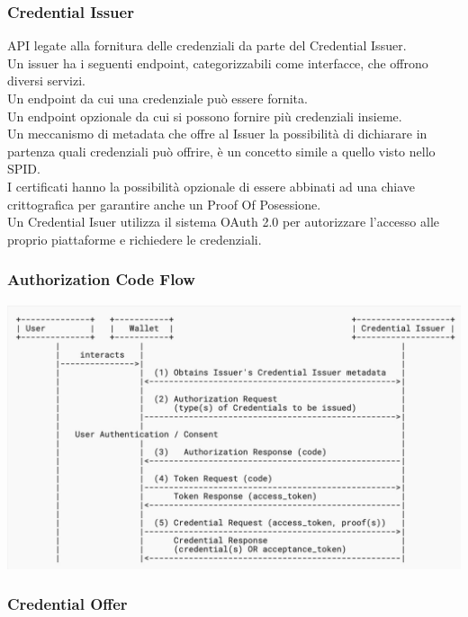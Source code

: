 \subsubsection{Credential Issuer}
API legate alla fornitura delle credenziali da parte del Credential Issuer.
\\Un issuer ha i seguenti endpoint, categorizzabili come interfacce, che offrono diversi servizi.
\\Un endpoint da cui una credenziale può essere fornita.
\\Un endpoint opzionale da cui si possono fornire più credenziali insieme.
\\Un meccanismo di metadata che offre al Issuer la possibilità di dichiarare in partenza quali credenziali può offrire, è un concetto simile a quello visto nello SPID.
\\I certificati hanno la possibilità opzionale di essere abbinati ad una chiave crittografica per garantire anche un Proof Of Posessione.
\\Un Credential Isuer utilizza il sistema OAuth 2.0 per autorizzare l'accesso alle proprio piattaforme e richiedere le credenziali.

\subsubsection{Authorization Code Flow}
\begin{center}
	\includegraphics[scale = 0.2]{./res/images/AuthorizationCodeFlow.jpg}
\end{center}

\subsubsection{Credential Offer}


